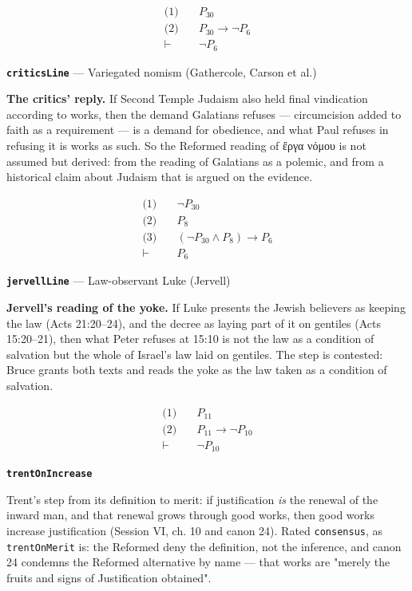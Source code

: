 \documentclass[11pt]{article}
\begin{document}
\begin{align*}
  \text{(1)} \quad & P_{30} \\
  \text{(2)} \quad & P_{30} \rightarrow \lnot P_{6} \\
  \vdash \quad & \lnot P_{6}
\end{align*}
\par\medskip\noindent\textbf{\texttt{critics\allowbreak{}Line}} --- Variegated nomism (Gathercole, Carson et al.)\par\nobreak\noindent
\textbf{The critics' reply.} If Second Temple Judaism also held final vindication according to works, then the demand Galatians refuses — circumcision added to faith as a requirement — is a demand for obedience, and what Paul refuses in refusing it is works as such. So the Reformed reading of ἔργα νόμου is not assumed but derived: from the reading of Galatians as a polemic, and from a historical claim about Judaism that is argued on the evidence.

\begin{align*}
  \text{(1)} \quad & \lnot P_{30} \\
  \text{(2)} \quad & P_{8} \\
  \text{(3)} \quad & (\lnot P_{30} \land P_{8}) \rightarrow P_{6} \\
  \vdash \quad & P_{6}
\end{align*}
\par\medskip\noindent\textbf{\texttt{jervell\allowbreak{}Line}} --- Law-observant Luke (Jervell)\par\nobreak\noindent
\textbf{Jervell's reading of the yoke.} If Luke presents the Jewish believers as keeping the law (Acts 21:20–24), and the decree as laying part of it on gentiles (Acts 15:20–21), then what Peter refuses at 15:10 is not the law as a condition of salvation but the whole of Israel's law laid on gentiles. The step is contested: Bruce grants both texts and reads the yoke as the law taken as a condition of salvation.

\begin{align*}
  \text{(1)} \quad & P_{11} \\
  \text{(2)} \quad & P_{11} \rightarrow \lnot P_{10} \\
  \vdash \quad & \lnot P_{10}
\end{align*}
\par\medskip\noindent\textbf{\texttt{trent\allowbreak{}On\allowbreak{}Increase}}\par\nobreak\noindent
Trent's step from its definition to merit: if justification \emph{is} the renewal of the inward man, and that renewal grows through good works, then good works increase justification (Session VI, ch. 10 and canon 24). Rated \texttt{consensus}, as \texttt{trent\allowbreak{}On\allowbreak{}Merit} is: the Reformed deny the definition, not the inference, and canon 24 condemns the Reformed alternative by name — that works are "merely the fruits and signs of Justification obtained".
\end{document}
